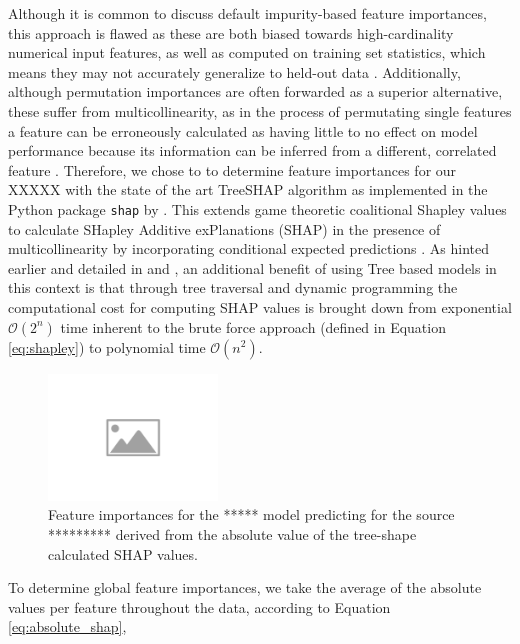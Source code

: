 \documentclass[fleqn,usenatbib]{mnras}
\begin{document}
Although it is common to discuss default impurity-based feature importances, this approach is flawed as these are both biased towards high-cardinality numerical input features, as well as computed on training set statistics, which means they may not accurately generalize to held-out data \citep{scikit-learn}. Additionally, although permutation importances are often forwarded as a superior alternative, these suffer from multicollinearity, as in the process of permutating single features a feature can be erroneously calculated as having little to no effect on model performance because its information can be inferred from a different, correlated feature \citep{Strobl2007,Nicodemus2010,hooker2019}. Therefore, we chose to to determine feature importances for our XXXXX with the state of the art
TreeSHAP algorithm as implemented in the Python package \texttt{shap} by \cite{SHAP_2017}. This extends game theoretic coalitional Shapley values to calculate SHapley Additive exPlanations (SHAP) in the presence of multicollinearity by incorporating conditional expected predictions \citep{shapley_values_original,SHAP_2017,molnar2022}. As hinted earlier and detailed in \cite{SHAP_2017} and \cite{molnar2022}, an additional benefit of using Tree based models in this context is that through tree traversal and dynamic programming the computational cost for computing SHAP values is brought down from exponential $\mathcal{O}(2^n)$ time inherent to the brute force approach (defined in Equation \ref{eq:shapley}) to polynomial time $\mathcal{O}(n^2)$. 

\begin{figure}
    \centering
    \includegraphics[width=0.4\textwidth]{figures/placeholder-image.png}
    \caption{Feature importances for the ***** model predicting for the source ********* derived from the absolute value of the tree-shape calculated SHAP values.}
    \label{fig:feature_importances}
\end{figure}

To determine global feature importances, we take the average of the absolute values per feature throughout the data, according to Equation \ref{eq:absolute_shap},
\end{document}
